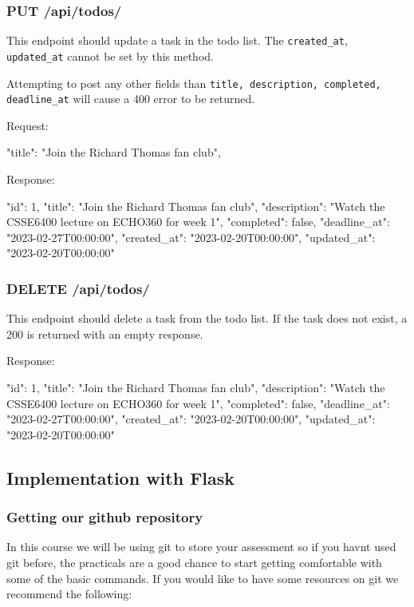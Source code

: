 \documentclass{csse4400}
\begin{document}
\subsubsection{PUT /api/todos/}
This endpoint should update a task in the todo list. The \texttt{created\_at}, \texttt{updated\_at} cannot be set by this method.

Attempting to post any other fields than \texttt{title, description, completed, deadline\_at} will cause a 400 error to be returned.

Request:
\begin{code}[language=json]{}
{
  "title": "Join the Richard Thomas fan club",
}
\end{code}

Response:
\begin{code}[language=json]{}
{
  "id": 1,
  "title": "Join the Richard Thomas fan club",
  "description": "Watch the CSSE6400 lecture on ECHO360 for week 1",
  "completed": false,
  "deadline_at": "2023-02-27T00:00:00",
  "created_at": "2023-02-20T00:00:00",
  "updated_at": "2023-02-20T00:00:00"
}
\end{code}

\subsubsection{DELETE /api/todos/}
This endpoint should delete a task from the todo list. If the task does not exist, a 200 is returned with an empty response.

Response:
\begin{code}[language=json]{}
{
  "id": 1,
  "title": "Join the Richard Thomas fan club",
  "description": "Watch the CSSE6400 lecture on ECHO360 for week 1",
  "completed": false,
  "deadline_at": "2023-02-27T00:00:00",
  "created_at": "2023-02-20T00:00:00",
  "updated_at": "2023-02-20T00:00:00"
}
\end{code}


\subsection{Implementation with Flask}

\subsubsection{Getting our github repository}

In this course we will be using git to store your assessment so if you havnt used git before, the practicals are a good chance to start getting comfortable with some of the basic commands. If you would like to have some resources on git we recommend the following:
\end{document}
